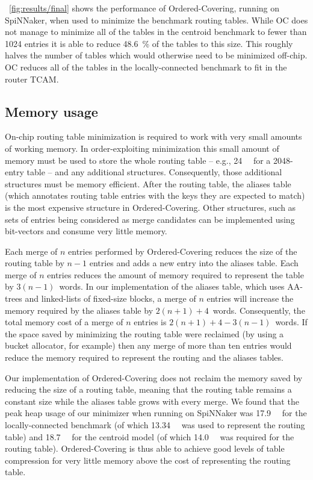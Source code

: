 \documentclass[conference]{IEEEtran}
\begin{document}
  \figurename~\ref{fig:results/final} shows the performance of Ordered-Covering, running on SpiNNaker, when used to minimize the benchmark routing tables.
  While OC does not manage to minimize all of the tables in the centroid benchmark to fewer than 1024 entries it is able to reduce \SI{48.6}{\percent} of the tables to this size.
  This roughly halves the number of tables which would otherwise need to be minimized off-chip.
  OC reduces all of the tables in the locally-connected benchmark to fit in the router TCAM.


  \subsection{Memory usage}


  On-chip routing table minimization is required to work with very small amounts of working memory.
  In order-exploiting minimization this small amount of memory must be used to store the whole routing table -- e.g., \SI{24}{\kibi\byte} for a 2048-entry table -- and any additional structures.
  Consequently, those additional structures must be memory efficient.
  After the routing table, the aliases table (which annotates routing table entries with the keys they are expected to match) is the most expensive structure in Ordered-Covering.
  Other structures, such as sets of entries being considered as merge candidates can be implemented using bit-vectors and consume very little memory.

  Each merge of $n$ entries performed by Ordered-Covering reduces the size of the routing table by $n-1$ entries and adds a new entry into the aliases table.
  Each merge of $n$ entries reduces the amount of memory required to represent the table by $3(n-1)$~words.
  In our implementation of the aliases table, which uses AA-trees and linked-lists of fixed-size blocks, a merge of $n$ entries will increase the memory required by the aliases table by $2(n + 1) + 4$~words.
  Consequently, the total memory cost of a merge of $n$ entries is $2(n + 1) + 4 - 3(n - 1)$~words.
  If the space saved by minimizing the routing table were reclaimed (by using a bucket allocator, for example) then any merge of more than ten entries would reduce the memory required to represent the routing and the aliases tables.

  Our implementation of Ordered-Covering does not reclaim the memory saved by reducing the size of a routing table, meaning that the routing table remains a constant size while the aliases table grows with every merge.
  We found that the peak heap usage of our minimizer when running on SpiNNaker was \SI{17.9}{\kibi\byte} for the locally-connected benchmark (of which \SI{13.34}{\kibi\byte} was used to represent the routing table) and \SI{18.7}{\kibi\byte} for the centroid model (of which \SI{14.0}{\kibi\byte} was required for the routing table).
  Ordered-Covering is thus able to achieve good levels of table compression for very little memory above the cost of representing the routing table.
\end{document}
